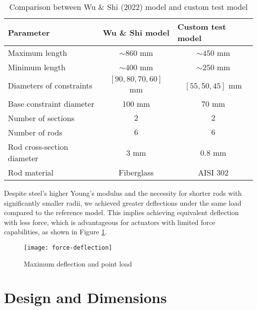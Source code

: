 \begin{table}[h]
    \centering
    \caption{Comparison between Wu \& Shi (2022) model and custom test model}
    \label{tab:comparison}
    \begin{tabular}{lcc}
    \toprule
    Parameter                  & \multicolumn{1}{l}{Wu \& Shi model \cite{wu2022}} & \multicolumn{1}{l}{Custom test model} \\ \midrule
    Maximum length             & $\sim860$ mm                     & $\sim450$ mm                       \\
    Minimum length             & $\sim400$ mm                     & $\sim250$ mm                        \\
    Diameters of constraints   & $[90, 80, 70, 60]$ mm               & $[55, 50, 45]$ mm                     \\
    Base constraint diameter   & 100 mm                              & 70 mm                                 \\
    Number of sections         & $2$                                 & $2$                                   \\
    Number of rods             & $6$                                 & $6$                                   \\
    Rod cross-section diameter & $3$ mm                              & $0.8$ mm                              \\
    Rod material               & Fiberglass                          & AISI 302                              \\ \bottomrule
    \end{tabular}
\end{table}

Despite steel's higher Young's modulus and the necessity for shorter rods with significantly smaller radii, we achieved greater deflections under the same load compared to the reference model. This implies achieving equivalent deflection with less force, which is advantageous for actuators with limited force capabilities, as shown in Figure \ref{fig:force-deflection}.

\begin{figure}
    \centering
    \texttt{[image: force-deflection]}
    \caption{Maximum deflection and point load}
    \label{fig:force-deflection}
\end{figure}

\section{Design and Dimensions}

